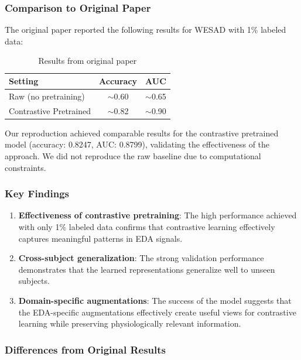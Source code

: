 \documentclass[10pt,letterpaper,twocolumn]{article}
\begin{document}
\subsubsection{Comparison to Original Paper}

The original paper reported the following results for WESAD with 1\% labeled data:

\begin{table}[ht]
\centering
\begin{tabular}{lcc}
\toprule
Setting & Accuracy & AUC \\
\midrule
Raw (no pretraining) & $\sim$0.60 & $\sim$0.65 \\
Contrastive Pretrained & $\sim$0.82 & $\sim$0.90 \\
\bottomrule
\end{tabular}
\caption{Results from original paper}
\label{tab:original}
\end{table}

Our reproduction achieved comparable results for the contrastive pretrained model (accuracy: 0.8247, AUC: 0.8799), validating the effectiveness of the approach. We did not reproduce the raw baseline due to computational constraints.

\subsubsection{Key Findings}

\begin{enumerate}
    \item \textbf{Effectiveness of contrastive pretraining}: The high performance achieved with only 1\% labeled data confirms that contrastive learning effectively captures meaningful patterns in EDA signals.
    
    \item \textbf{Cross-subject generalization}: The strong validation performance demonstrates that the learned representations generalize well to unseen subjects.
    
    \item \textbf{Domain-specific augmentations}: The success of the model suggests that the EDA-specific augmentations effectively create useful views for contrastive learning while preserving physiologically relevant information.
\end{enumerate}

\subsubsection{Differences from Original Results}
\end{document}
